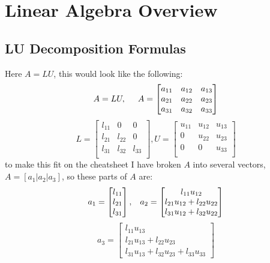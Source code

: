 \section{Linear Algebra Overview}

\subsection*{LU Decomposition Formulas}
Here $A = LU$, this would look like the following:
\[
A = LU, \hspace{5mm}
A =
\begin{bmatrix}
  a_{11} & a_{12} & a_{13} \\
  a_{21} & a_{22} & a_{23} \\
  a_{31} & a_{32} & a_{33} \\
\end{bmatrix}
\]
\[
L =
\begin{bmatrix}
  l_{11} & 0 & 0 \\
  l_{21} & l_{22} & 0 \\
  l_{31} & l_{32} & l_{33} \\
\end{bmatrix},
U =
\begin{bmatrix}
  u_{11} & u_{12} & u_{13} \\
  0 & u_{22} & u_{23} \\
  0 & 0 & u_{33} \\
\end{bmatrix}
\]
to make this fit on the cheatsheet I have broken $A$ into several vectors,
$A = [ a_1 | a_2 | a_3 ]$, so these parts of $A$ are:
\newline
$$
a_1 =
\begin{bmatrix}
l_{11} \\
l_{21} \\
l_{31}
\end{bmatrix}
, \hspace{3mm}
a_2 =
\begin{bmatrix}
  l_{11} u_{12} \\
  l_{21} u_{12} + l_{22} u_{22} \\
  l_{31} u_{12} + l_{32} u_{22}
\end{bmatrix}
$$
$$
a_3 =
\begin{bmatrix}
  l_{11} u_{13} \\
  l_{21} u_{13} + l_{22} u_{23} \\
  l_{31} u_{13} + l_{32} u_{23} + l_{33} u_{33}
\end{bmatrix}
$$


